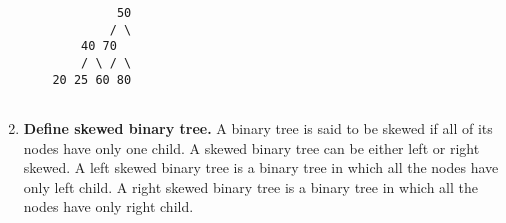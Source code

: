 \documentclass[11pt]{article}
\begin{document}
\begin{enumerate}
\begin{verbatim}
             50
            / \
        40 70
        / \ / \
    20 25 60 80
    

    \end{verbatim}
	\item \textbf{Define skewed binary tree.}
	      A binary tree is said to be skewed if all of its nodes have only one child. A skewed binary tree can be either left or right skewed. A left skewed binary tree is a binary tree in which all the nodes have only left child. A right skewed binary tree is a binary tree in which all the nodes have only right child.
\end{enumerate}
\end{document}
